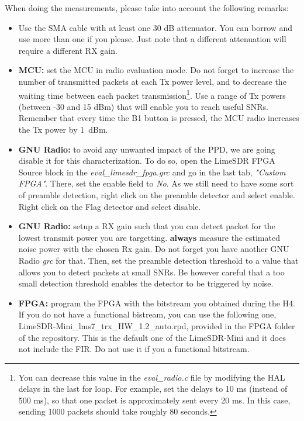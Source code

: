 When doing the measurements, please take into account the following remarks:
\begin{itemize}
    \item Use the SMA cable with at least one 30 dB attenuator. You can borrow and use more than one if you please. Just note that a different attenuation will require a different RX gain.
    \item \textbf{MCU:} set the MCU in radio evaluation mode. Do not forget to increase the number of transmitted packets at each Tx power level, and to decrease the waiting time between each packet transmission\footnote{You can decrease this value in the \textit{eval\_radio.c} file by modifying the HAL delays in the last for loop. For example, set the delays to 10 ms (instead of 500 ms), so that one packet is approximately sent every 20 ms. In this case, sending 1000 packets should take roughly 80 seconds.}. Use a range of Tx powers (between -30 and 15 dBm) that will enable you to reach useful SNRs. Remember that every time the B1 button is pressed, the MCU radio increases the Tx power by 1~dBm.
    \item \textbf{GNU Radio:} to avoid any unwanted impact of the PPD, we are going disable it for this characterization. To do so, open the LimeSDR FPGA Source block in the \textit{eval\_limesdr\_fpga.grc} and go in the last tab, \textit{"Custom FPGA"}. There, set the enable field to \textit{No}. As we still need to have some sort of preamble detection, right click on the preamble detector and select enable. Right click on the Flag detector and  select disable. 
    \item \textbf{GNU Radio:} setup a RX gain such that you can detect packet for the lowest transmit power you are targetting. \textbf{always} measure the estimated noise power with the chosen Rx gain. Do not forget you have another GNU Radio \textit{grc} for that. Then, set the preamble detection threshold to a value that allows you to detect packets at small SNRs. Be however careful that a too small detection threshold enables the detector to be triggered by noise.
    \item \textbf{FPGA:} program the FPGA with the bitstream you obtained during the H4. If you do not have a functional bistream, you can use the following one, {LimeSDR-Mini\_lms7\_trx\_HW\_1.2\_auto.rpd}, provided in the FPGA folder of the repository. This is the default one of the LimeSDR-Mini and it does not include the FIR. Do not use it if you a functional bitstream. 
\end{itemize}


